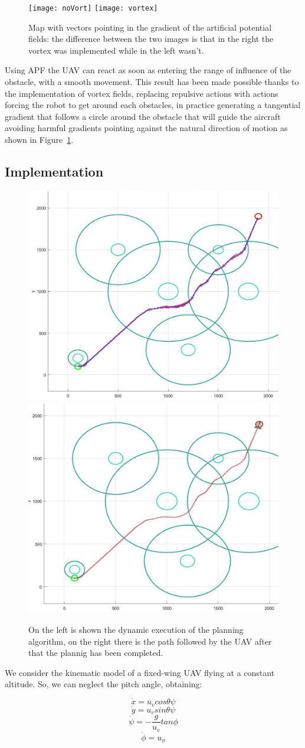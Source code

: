 \documentclass[oneside,onecolumn]{article}
\begin{document}
\begin{figure}
\centering
   {\texttt{[image: noVort]}} \quad
   {\texttt{[image: vortex]}} \\
\caption{Map with vectors pointing in the gradient of the artificial potential
  fields: the difference between the two images is that in the right the vortex
  was implemented while in the left wasn't.}
\label{fig:subfig1}
\end{figure}

Using APF the UAV can react as soon as entering the range of influence of the
obstacle, with a smooth movement. This result has been made possible thanks to
the implementation of vortex fields, replacing repulsive actions with actions
forcing the robot to get around each obstacles, in practice generating a
tangential gradient that follows a circle around the obstacle that will guide
the aircraft avoiding harmful gradients pointing against the natural direction
of motion as shown in Figure~\ref{fig:subfig1}.
\subsection{Implementation}
\begin{figure}
\centering
   {\includegraphics[width=.45\textwidth]{execution}} \quad
   {\includegraphics[width=.45\textwidth]{finalPath}} \\
\caption{On the left is shown the dynamic execution of the planning algorithm,
  on the right there is the path followed by the UAV after that the plannig has been completed.}
\label{fig:subfig2}
\end{figure}
We consider the kinematic model of a fixed-wing UAV flying at a constant
altitude.
So, we can neglect the pitch angle, obtaining:\\
\begin{center}
\[
  \dot{x} = u_{v}cos{\theta} \psi
\]
\[
  \dot{y} = u_{v}sin{\theta} \psi
\]
\[
  \dot{\psi} = - \frac{g}{u_{v}} tan \phi 
\]
\[
  \dot{\phi} = u_{\phi}
\]
\end{center}
\end{document}
